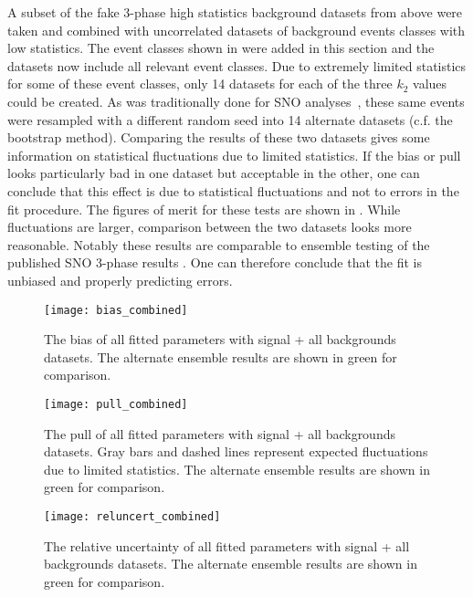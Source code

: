 A subset of the fake 3-phase high statistics background datasets from above were taken and combined with uncorrelated datasets of background events classes with low statistics.
The event classes shown in  were added in this section and the datasets now include all relevant event classes.
Due to extremely limited statistics for some of these event classes, only 14 datasets for each of the three $k_2$ values could be created.
As was traditionally done for SNO analyses~\cite{plthesis}, these same events were resampled with a different random seed into 14 alternate datasets (c.f. the bootstrap method).
Comparing the results of these two datasets gives some information on statistical fluctuations due to limited statistics.
If the bias or pull looks particularly bad in one dataset but acceptable in the other, one can conclude that this effect is due to statistical fluctuations and not to errors in the fit procedure.
The figures of merit for these tests are shown in . 
While fluctuations are larger, comparison between the two datasets looks more reasonable. 
Notably these results are comparable to ensemble testing of the published SNO 3-phase results \cite{3phase}.
One can therefore conclude that the fit is unbiased and properly predicting errors.

\begin{figure}
\centering
\texttt{[image: bias\_combined]}
\caption{
The bias of all fitted parameters with signal + all backgrounds datasets. The alternate ensemble results are shown in green for comparison.
}
\label{fig:allbg_bias}
\end{figure}

\begin{figure}
\centering
\texttt{[image: pull\_combined]}
\caption{
The pull of all fitted parameters with signal + all backgrounds datasets. Gray bars and dashed lines represent expected fluctuations due to limited statistics. The alternate ensemble results are shown in green for comparison.
}
\label{fig:allbg_pull}
\end{figure}

\begin{figure}
\centering
\texttt{[image: reluncert\_combined]}
\caption{
The relative uncertainty of all fitted parameters with signal + all backgrounds datasets. The alternate ensemble results are shown in green for comparison.
}
\label{fig:allbg_reluncert}
\end{figure}

